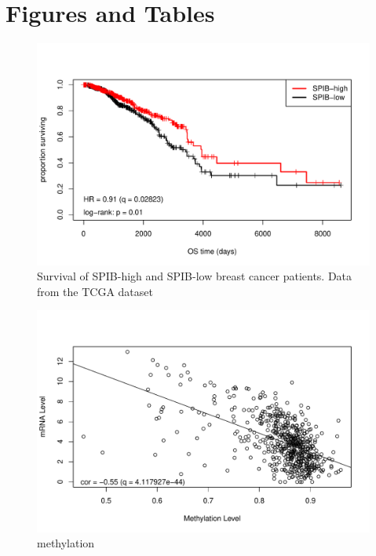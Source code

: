 \section{Figures and Tables}

\begin{figure}
    \centering
    \includegraphics[scale=0.75]{figures/km_plot.pdf}
    \caption{Survival of SPIB-high and SPIB-low breast cancer patients. Data from the TCGA dataset \cite{Ciriello2015, Goldman2018}}
    \label{km_plot}
\end{figure} 

\begin{figure}
    \centering
    \includegraphics[scale=0.75]{figures/methylation.pdf}
    \caption{methylation \cite{Ciriello2015, Goldman2018}}
    \label{methylation}
\end{figure} 